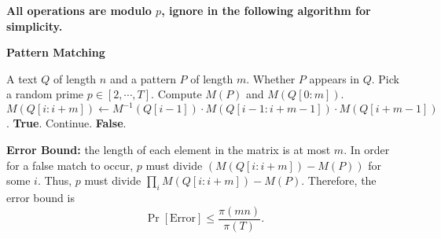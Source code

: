 \begin{answer}
\begin{enumerate}[label=\alph*).]
		\textbf{All operations are modulo $p$, ignore in the following algorithm for simplicity.}
		\begin{algo}
			\caption{\textbf{Pattern Matching}}
			\begin{algorithmic}[1]
				\Require A text $Q$ of length $n$ and a pattern $P$ of length $m$.
				\Ensure Whether $P$ appears in $Q$.
				\State Pick a random prime $p\in [2, \cdots, T]$.
				\State Compute $M(P)$ and $M(Q[0:m])$. 
					\State $M(Q[i:i+m]) \leftarrow M^{-1}(Q[i-1])\cdot M(Q[i-1:i+m-1])\cdot M(Q[i+m-1])$.
						\State \Return \textbf{True}.
					\Else
						\State Continue.
					\EndIf
				\EndFor
				\State \Return \textbf{False}.
			\end{algorithmic}
		\end{algo}
		\textbf{Error Bound:} the length of each element in the matrix is at most $m$. 
		In order for a false match to occur, $p$ must divide $(M(Q[i:i+m]) - M(P))$ for some $i$. 
		Thus, $p$ must divide $\prod_{i} M(Q[i:i+m]) - M(P)$. 
		Therefore, the error bound is
		\[
			\Pr[\text{Error}] \le \frac{\pi(mn)}{\pi(T)}.
		\]
	\end{enumerate}
	\ed
\end{answer}
